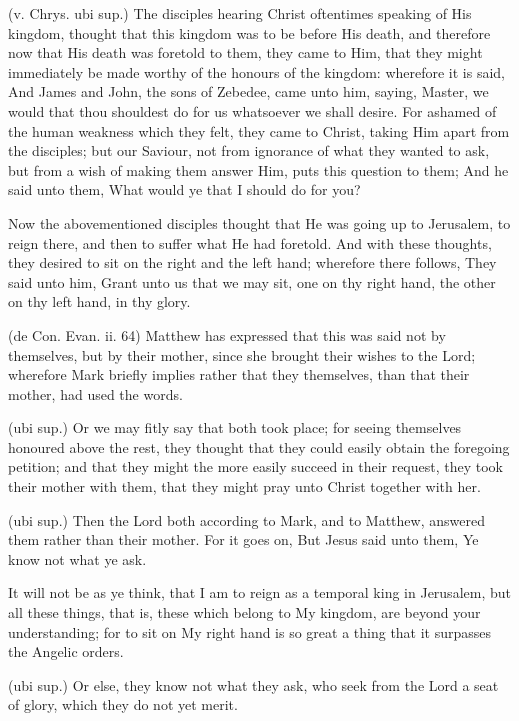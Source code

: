  (v. Chrys. ubi sup.) The disciples hearing Christ oftentimes speaking of His kingdom, thought that this kingdom was to be before His death, and therefore now that His death was foretold to them, they came to Him, that they might immediately be made worthy of the honours of the kingdom: wherefore it is said, And James and John, the sons of Zebedee, came unto him, saying, Master, we would that thou shouldest do for us whatsoever we shall desire. For ashamed of the human weakness which they felt, they came to Christ, taking Him apart from the disciples; but our Saviour, not from ignorance of what they wanted to ask, but from a wish of making them answer Him, puts this question to them; And he said unto them, What would ye that I should do for you?

 Now the abovementioned disciples thought that He was going up to Jerusalem, to reign there, and then to suffer what He had foretold. And with these thoughts, they desired to sit on the right and the left hand; wherefore there follows, They said unto him, Grant unto us that we may sit, one on thy right hand, the other on thy left hand, in thy glory.

 (de Con. Evan. ii. 64) Matthew has expressed that this was said not by themselves, but by their mother, since she brought their wishes to the Lord; wherefore Mark briefly implies rather that they themselves, than that their mother, had used the words.

 (ubi sup.) Or we may fitly say that both took place; for seeing themselves honoured above the rest, they thought that they could easily obtain the foregoing petition; and that they might the more easily succeed in their request, they took their mother with them, that they might pray unto Christ together with her.

 (ubi sup.) Then the Lord both according to Mark, and to Matthew, answered them rather than their mother. For it goes on, But Jesus said unto them, Ye know not what ye ask.

 It will not be as ye think, that I am to reign as a temporal king in Jerusalem, but all these things, that is, these which belong to My kingdom, are beyond your understanding; for to sit on My right hand is so great a thing that it surpasses the Angelic orders.

 (ubi sup.) Or else, they know not what they ask, who seek from the Lord a seat of glory, which they do not yet merit.

